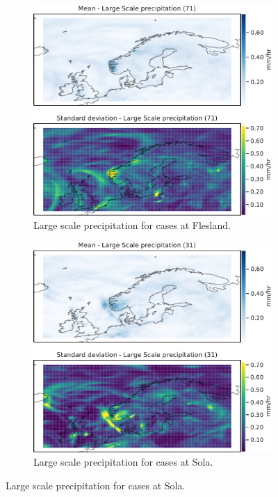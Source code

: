 \begin{figure}
     \centering
     \begin{subfigure}[b]{0.49\textwidth}
         \centering
         \includegraphics[width=\textwidth]{Figures/lsPENBR.pdf}
         \caption{Large scale precipitation for cases at  Flesland.}
         \label{fig:ENBRlsP}
     \end{subfigure}
     \hfill
     \begin{subfigure}[b]{0.49\textwidth}
         \centering
         \includegraphics[width=\textwidth]{Figures/lsPENZV.pdf}
         \caption{Large scale precipitation for cases at Sola.}
         \label{fig:ENZVlsP}
     \end{subfigure}


\end{figure}
